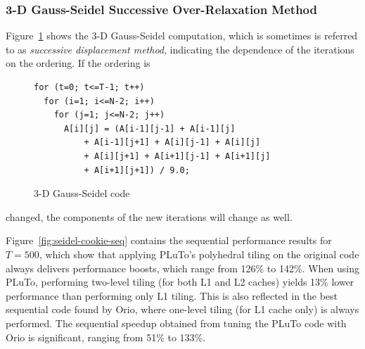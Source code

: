\subsubsection{3-D Gauss-Seidel Successive Over-Relaxation Method}  
Figure~\ref{fig:seidel-code} shows the 3-D Gauss-Seidel computation, 
which is sometimes is referred to as
\emph{successive displacement method}, indicating the dependence of the 
iterations on the ordering. If the ordering is
%
\begin{figure}
\vspace{-0.3in}
\begin{center}
\begin{minipage}{3in} 
\scriptsize
\begin{verbatim} 
for (t=0; t<=T-1; t++) 
  for (i=1; i<=N-2; i++) 
    for (j=1; j<=N-2; j++) 
      A[i][j] = (A[i-1][j-1] + A[i-1][j] 
          + A[i-1][j+1] + A[i][j-1] + A[i][j] 
          + A[i][j+1] + A[i+1][j-1] + A[i+1][j] 
          + A[i+1][j+1]) / 9.0; 
\end{verbatim} 
\end{minipage} 
\end{center}
\vspace{-0.2in}
\caption{3-D Gauss-Seidel code} 
\label{fig:seidel-code} 
\vspace{-.1in}
\end{figure}
%
changed, the components of the new iterations will change as well. 

Figure~\ref{fig:seidel-cookie-seq} contains the sequential performance
results for $T=500$, which show that applying PLuTo's polyhedral tiling on
the original code always delivers performance boosts, which range from 126\%
to 142\%. When using PLuTo, performing two-level tiling (for both L1 and L2
caches) yields 13\% lower performance than performing only L1 tiling. 
This is also reflected in the best sequential code found by Orio, where
one-level tiling (for L1 cache only) is always performed. The sequential
speedup obtained from tuning the PLuTo code with Orio is significant, ranging
from 51\% to 133\%.

